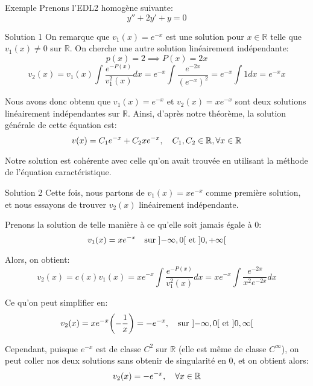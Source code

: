 \documentclass[a4paper]{article}
\begin{document}
\begin{parag}{Exemple}
    Prenons l'EDL2 homogène suivante: 
    \[y'' + 2y' + y = 0\]
    
    \begin{subparag}{Solution 1}
        On remarque que $v_1\left(x\right) = e^{-x}$ est une solution pour $x \in \mathbb{R}$ telle que $v_1\left(x\right) \neq 0$ sur $\mathbb{R}$. On cherche une autre solution linéairement indépendante: 
        \[p\left(x\right) = 2 \implies P\left(x\right) = 2x\]
        \[v_2\left(x\right) = v_1\left(x\right) \int \frac{e^{-P\left(x\right)}}{v_1^2\left(x\right)}dx = e^{-x} \int \frac{e^{-2x}}{\left(e^{-x}\right)^2} = e^{-x} \int 1 dx = e^{-x} x\]

        Nous avons donc obtenu que $v_1\left(x\right) = e^{-x}$ et $v_2\left(x\right) = xe^{-x}$ sont deux solutions linéairement indépendantes sur $\mathbb{R}$. Ainsi, d'après notre théorème, la solution générale de cette équation est: 
        \[v\left(x\right) = C_1e^{-x} + C_2xe^{-x}, \mathspace C_1, C_2 \in\mathbb{R}, \forall x \in\mathbb{R}\]
        
        Notre solution est cohérente avec celle qu'on avait trouvée en utilisant la méthode de l'équation caractéristique.
    \end{subparag}

    \begin{subparag}{Solution 2}
        Cette fois, nous partons de $v_1\left(x\right) = xe^{-x}$ comme première solution, et nous essayons de trouver $v_2\left(x\right)$ linéairement indépendante. 

        Prenons la solution de telle manière à ce qu'elle soit jamais égale à 0: 
        \[v_1\left(x\right) = xe^{-x} \mathspace \text{sur } \left]-\infty, 0\right[ \text{ et } \left]0, +\infty\right[ \]
        
        Alors, on obtient: 
        \[v_2\left(x\right) = c\left(x\right)v_1\left(x\right) = xe^{-x} \int \frac{e^{-P\left(x\right)}}{v_1^2\left(x\right)}dx = xe^{-x} \int \frac{e^{-2x}}{x^2 e^{-2x}} dx \]

        Ce qu'on peut simplifier en:
        \[v_2\left(x\right) = x e^{-x} \left(-\frac{1}{x}\right) = -e^{-x}, \mathspace \text{sur } \left]-\infty, 0\right[ \text{ et } \left]0, \infty\right[\]
        

        Cependant, puisque $e^{-x}$ est de classe $C^2$ sur $\mathbb{R}$ (elle est même de classe $C^{\infty}$), on peut coller nos deux solutions sans obtenir de singularité en 0, et on obtient alors: 
        \[v_2\left(x\right) = -e^{-x}, \mathspace\forall x \in \mathbb{R}\]
        

\end{subparag}
\end{parag}
\end{document}
